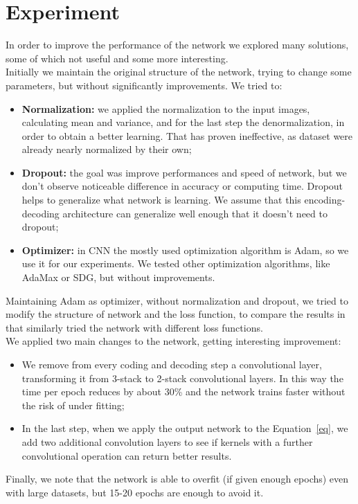 \documentclass[11pt, a4paper]{article}
\begin{document}
	\section{Experiment} %
	In order to improve the performance of the network we explored many solutions, some of which not useful and some more interesting.\\
	Initially we maintain the original structure of the network, trying to change some parameters, but without significantly improvements. We tried to:
	\begin{itemize}
		\item \textbf{Normalization:} we applied the normalization to the input images, calculating mean and variance, and for the last step the denormalization, in order to obtain a better learning. That has proven ineffective, as dataset were already nearly normalized by their own;
		\item \textbf{Dropout:} the goal was improve performances and speed of network, but we don't observe noticeable difference in accuracy or computing time. Dropout helps to generalize what network is learning. We assume that this encoding-decoding architecture can generalize well enough that it doesn't need to dropout; 
		\item \textbf{Optimizer:} in CNN the mostly used optimization algorithm is Adam, so we use it for our experiments. We tested other optimization algorithms, like AdaMax or SDG, but without improvements.
	\end{itemize}
	Maintaining Adam as optimizer, without normalization and dropout, we tried to modify the structure of network and the loss function, to compare the results in \cite{mainpaper} that similarly tried the network with different loss functions.\\
	We applied two main changes to the network, getting interesting improvement:
	\begin{itemize}
		\item We remove from every coding and decoding step a convolutional layer, transforming it from 3-stack to 2-stack convolutional layers. In this way the time per epoch reduces by about 30\% and the network trains faster without the risk of under fitting;
		\item In the last step, when we apply the output network to the Equation~\ref{eq}, we add two additional convolution layers to see if kernels with a further convolutional operation can return better results. 
	\end{itemize}
	Finally, we note that the network is able to overfit (if given enough epochs) even with large datasets, but 15-20 epochs are enough to avoid it.
	
\end{document}
